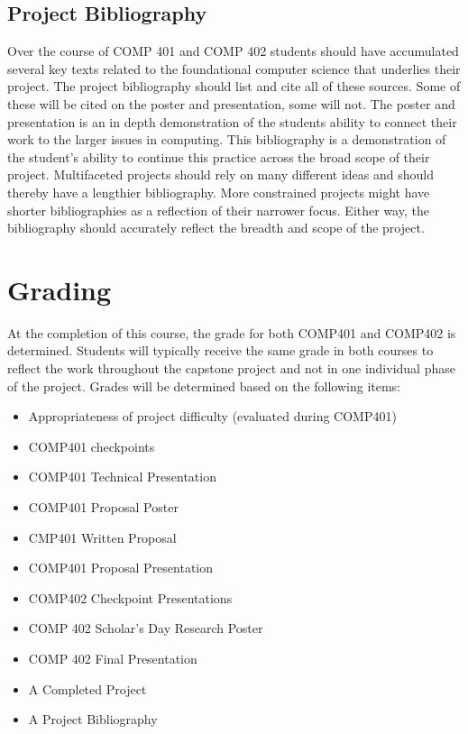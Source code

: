 \documentclass[10pt]{article}
\begin{document}
\subsection{Project Bibliography}

Over the course of COMP 401 and COMP 402 students should have accumulated several key texts related to the foundational computer science that underlies their project. The project bibliography should list and cite all of these sources. Some of these will be cited on the poster and presentation, some will not. The poster and presentation is an in depth demonstration of the students ability to connect their work to the larger issues in computing. This bibliography is a demonstration of the student's ability to continue this practice across the broad scope of their project. Multifaceted projects should rely on many different ideas and should thereby have a lengthier bibliography. More constrained projects might have shorter bibliographies as a reflection of their narrower focus. Either way, the bibliography should accurately reflect the breadth and scope of the project. 


\section{Grading}

At the completion of this course, the grade for both COMP401 and COMP402 is determined. Students will typically receive the same grade in both courses to reflect the work throughout the capstone project and not in one individual phase of the project. Grades will be determined based on the following items:
\begin{itemize}
\item Appropriateness of project difficulty (evaluated during COMP401) 
\item COMP401 checkpoints
\item COMP401 Technical Presentation
\item COMP401 Proposal Poster
\item CMP401 Written Proposal
\item COMP401 Proposal Presentation
\item COMP402 Checkpoint Presentations 
\item COMP 402 Scholar's Day Research Poster
\item COMP 402 Final Presentation 
\item A Completed Project 
\item A Project Bibliography
\end{itemize}
\end{document}
